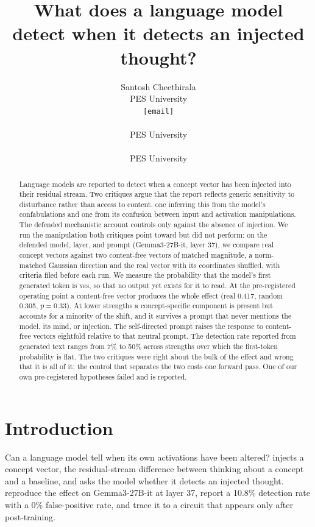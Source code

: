 \documentclass{article}
\title{What does a language model detect when it detects an injected thought?}
\author{%
  Santosh Cheethirala \\
  PES University \\
  \texttt{[email]} \\
  \And
  [Co-author] \\
  PES University \\
  \And
  [Mentor] \\
  PES University \\
}
\begin{document}
\maketitle

\begin{abstract}
Language models are reported to detect when a concept vector has been injected into their
residual stream. Two critiques argue that the report reflects generic sensitivity to
disturbance rather than access to content, one inferring this from the model's
confabulations and one from its confusion between input and activation manipulations. The
defended mechanistic account controls only against the absence of injection. We run the
manipulation both critiques point toward but did not perform: on the defended model, layer,
and prompt (Gemma3-27B-it, layer 37), we compare real concept vectors against two
content-free vectors of matched magnitude, a norm-matched Gaussian direction and the real
vector with its coordinates shuffled, with criteria filed before each run. We measure the
probability that the model's first generated token is \textsc{yes}, so that no output yet
exists for it to read. At the pre-registered operating point a content-free vector produces
the whole effect (real 0.417, random 0.305, $p=0.33$). At lower strengths a concept-specific
component is present but accounts for a minority of the shift, and it survives a prompt that
never mentions the model, its mind, or injection. The self-directed prompt raises the
response to content-free vectors eightfold relative to that neutral prompt. The detection
rate reported from generated text ranges from 7\% to 50\% across strengths over which the
first-token probability is flat. The two critiques were right about the bulk of the effect
and wrong that it is all of it; the control that separates the two costs one forward pass.
One of our own pre-registered hypotheses failed and is reported.
\end{abstract}

\section{Introduction}

Can a language model tell when its own activations have been altered? \citet{lindsey2025introspection}
injects a concept vector, the residual-stream difference between thinking about a concept
and a baseline, and asks the model whether it detects an injected thought. \citet{macar2026mechanisms}
reproduce the effect on Gemma3-27B-it at layer 37, report a 10.8\% detection rate with a 0\%
false-positive rate, and trace it to a circuit that appears only after post-training.
\end{document}

